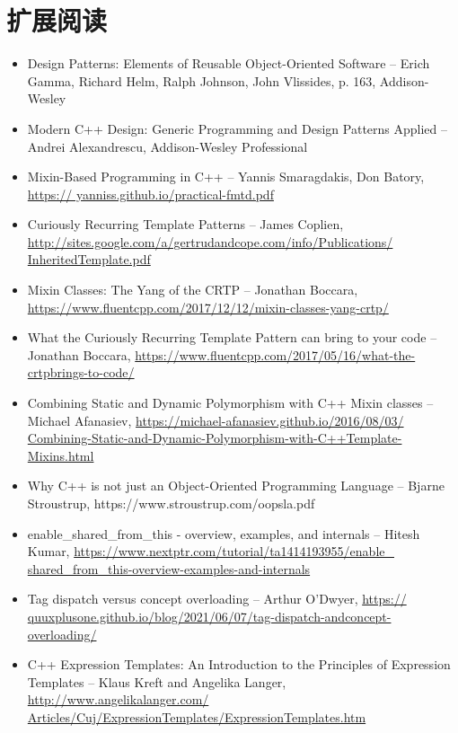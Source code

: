 \section{扩展阅读}
\begin{itemize}
\item
Design Patterns: Elements of Reusable Object-Oriented Software – Erich Gamma, Richard Helm, Ralph Johnson, John Vlissides, p. 163, Addison-Wesley

\item
Modern C++ Design: Generic Programming and Design Patterns Applied – Andrei Alexandrescu, Addison-Wesley Professional

\item
Mixin-Based Programming in C++ – Yannis Smaragdakis, Don Batory, \url{https:// yanniss.github.io/practical-fmtd.pdf}

\item
Curiously Recurring Template Patterns – James Coplien, \url{http://sites.google.com/a/gertrudandcope.com/info/Publications/ InheritedTemplate.pdf}

\item
Mixin Classes: The Yang of the CRTP – Jonathan Boccara, \url{https://www.fluentcpp.com/2017/12/12/mixin-classes-yang-crtp/}

\item
What the Curiously Recurring Template Pattern can bring to your code – Jonathan Boccara, \url{https://www.fluentcpp.com/2017/05/16/what-the-crtpbrings-to-code/}

\item
Combining Static and Dynamic Polymorphism with C++ Mixin classes – Michael Afanasiev, \url{https://michael-afanasiev.github.io/2016/08/03/ Combining-Static-and-Dynamic-Polymorphism-with-C++Template-Mixins.html}

\item
Why C++ is not just an Object-Oriented Programming Language – Bjarne Stroustrup, https://www.stroustrup.com/oopsla.pdf

\item
enable\_shared\_from\_this - overview, examples, and internals – Hitesh Kumar, \url{https://www.nextptr.com/tutorial/ta1414193955/enable_ shared_from_this-overview-examples-and-internals}

\item
Tag dispatch versus concept overloading – Arthur O’Dwyer, \url{https:// quuxplusone.github.io/blog/2021/06/07/tag-dispatch-andconcept-overloading/}

\item
C++ Expression Templates: An Introduction to the Principles of Expression Templates – Klaus Kreft and Angelika Langer, \url{http://www.angelikalanger.com/ Articles/Cuj/ExpressionTemplates/ExpressionTemplates.htm}


\end{itemize}
